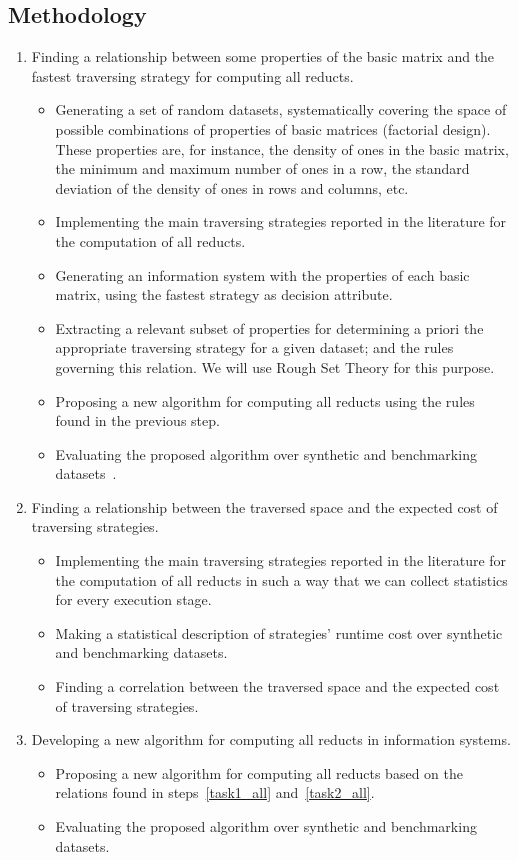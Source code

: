 \documentclass[authoryear,11pt]{elsarticle}
\begin{document}
\subsection{Methodology}\label{Methodology} 
\begin{enumerate}
	\item Finding a relationship between some properties of the basic matrix and the fastest 
  		  traversing strategy for computing all reducts.\label{task1_all}
	\begin{itemize}
  		\item Generating a set of random datasets, systematically covering the space of possible combinations
  			  of properties of basic matrices (factorial design). These properties are, for instance, the 
  			  density of ones in the basic matrix, the minimum and maximum number of ones in a row, the 
  			  standard deviation of the density of ones in rows and columns, etc.
  		\item Implementing the main traversing strategies reported in the literature for the computation of all
  			  reducts.
  		\item Generating an information system with the properties of each basic matrix, using 
  			  the fastest strategy as decision attribute.
  		\item Extracting a relevant subset of properties for determining a priori the appropriate 
  			  traversing strategy for a given dataset; and the rules governing this relation. We will use
  			  Rough Set Theory for this purpose.
  		\item Proposing a new algorithm for computing all reducts using the rules found in
  			  the previous step.
  		\item Evaluating the proposed algorithm over synthetic and benchmarking datasets~\citep{Bache13}.
  	\end{itemize}
  	\item Finding a relationship between the traversed space and the expected cost of traversing strategies.
  	\label{task2_all}
  	\begin{itemize}
  		\item Implementing the main traversing strategies reported in the literature for the computation of all
  			  reducts in such a way that we can collect statistics for every execution stage.
  		\item Making a statistical description  of strategies' runtime cost over synthetic and benchmarking
  			  datasets.
  		\item Finding a correlation between the traversed space and the expected cost of traversing strategies.
  	\end{itemize}
  	\item Developing a new algorithm for computing all reducts in information systems.
  	\begin{itemize}
  		\item Proposing a new algorithm for computing all reducts based on the relations found in 
  			  steps~\ref{task1_all} and~\ref{task2_all}.
  		\item Evaluating the proposed algorithm over synthetic and benchmarking datasets.
  	\end{itemize}
  	

\end{enumerate}
\end{document}
